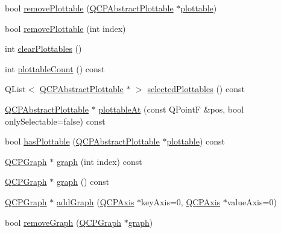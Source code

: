 \begin{DoxyCompactItemize}
\item 
bool \mbox{\hyperlink{class_q_custom_plot_af3dafd56884208474f311d6226513ab2}{remove\+Plottable}} (\mbox{\hyperlink{class_q_c_p_abstract_plottable}{Q\+C\+P\+Abstract\+Plottable}} $\ast$\mbox{\hyperlink{class_q_custom_plot_a32de81ff53e263e785b83b52ecd99d6f}{plottable}})
\item 
bool \mbox{\hyperlink{class_q_custom_plot_afc210e0021480f8119bccf37839dbcc8}{remove\+Plottable}} (int index)
\item 
int \mbox{\hyperlink{class_q_custom_plot_a9a409bb3201878adb7ffba1c89c4e004}{clear\+Plottables}} ()
\item 
int \mbox{\hyperlink{class_q_custom_plot_a5f4f15991c14bf9ad659bb2a19dfbed4}{plottable\+Count}} () const
\item 
Q\+List$<$ \mbox{\hyperlink{class_q_c_p_abstract_plottable}{Q\+C\+P\+Abstract\+Plottable}} $\ast$ $>$ \mbox{\hyperlink{class_q_custom_plot_a747faaab57c56891e901a1e97fa4359a}{selected\+Plottables}} () const
\item 
\mbox{\hyperlink{class_q_c_p_abstract_plottable}{Q\+C\+P\+Abstract\+Plottable}} $\ast$ \mbox{\hyperlink{class_q_custom_plot_acddbbd8b16dd633f0d94e5a736fbd8cf}{plottable\+At}} (const Q\+PointF \&pos, bool only\+Selectable=false) const
\item 
bool \mbox{\hyperlink{class_q_custom_plot_a72cefbfbb9e699940e37be605bd9c51e}{has\+Plottable}} (\mbox{\hyperlink{class_q_c_p_abstract_plottable}{Q\+C\+P\+Abstract\+Plottable}} $\ast$\mbox{\hyperlink{class_q_custom_plot_a32de81ff53e263e785b83b52ecd99d6f}{plottable}}) const
\item 
\mbox{\hyperlink{class_q_c_p_graph}{Q\+C\+P\+Graph}} $\ast$ \mbox{\hyperlink{class_q_custom_plot_a6ecae130f684b25276fb47bd3a5875c6}{graph}} (int index) const
\item 
\mbox{\hyperlink{class_q_c_p_graph}{Q\+C\+P\+Graph}} $\ast$ \mbox{\hyperlink{class_q_custom_plot_aac190865a67f19af3fdf2136774997af}{graph}} () const
\item 
\mbox{\hyperlink{class_q_c_p_graph}{Q\+C\+P\+Graph}} $\ast$ \mbox{\hyperlink{class_q_custom_plot_a6fb2873d35a8a8089842d81a70a54167}{add\+Graph}} (\mbox{\hyperlink{class_q_c_p_axis}{Q\+C\+P\+Axis}} $\ast$key\+Axis=0, \mbox{\hyperlink{class_q_c_p_axis}{Q\+C\+P\+Axis}} $\ast$value\+Axis=0)
\item 
bool \mbox{\hyperlink{class_q_custom_plot_a903561be895fb6528a770d66ac5e6713}{remove\+Graph}} (\mbox{\hyperlink{class_q_c_p_graph}{Q\+C\+P\+Graph}} $\ast$\mbox{\hyperlink{class_q_custom_plot_a6ecae130f684b25276fb47bd3a5875c6}{graph}})

\end{DoxyCompactItemize}
